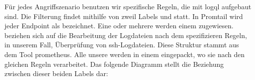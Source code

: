 





Für jedes Angriffszenario benutzen wir spezifische Regeln, die mit \gls{logql} aufgebaut sind. Die Filterung findet mithilfe von zweil Labels  und  statt. In Promtail wird jeder \gls{Endpoint} als  bezeichnet. Eine oder mehrere  werden einem  zugewiesen.  beziehen sich auf die Bearbeitung der Logdateien nach dem spezifizieren Regeln, in unserem Fall, Überprüfung von \gls{ssh}-Logdateien. Diese Struktur stammt aus dem Tool \gls{prometheus}. Alle unsere  werden in einem  eingepackt, wo sie nach den gleichen Regeln verarbeitet. Das folgende Diagramm stellt die Beziehung zwischen dieser beiden Labels dar:

